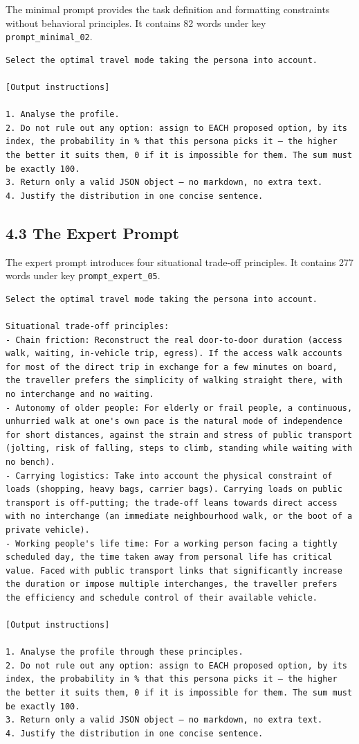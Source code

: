 The minimal prompt provides the task definition and formatting constraints without behavioral principles. It contains 82 words under key \texttt{prompt_minimal_02}.

\begin{Verbatim}
Select the optimal travel mode taking the persona into account.

[Output instructions]

1. Analyse the profile.
2. Do not rule out any option: assign to EACH proposed option, by its index, the probability in % that this persona picks it — the higher the better it suits them, 0 if it is impossible for them. The sum must be exactly 100.
3. Return only a valid JSON object — no markdown, no extra text.
4. Justify the distribution in one concise sentence.
\end{Verbatim}

\subsection{4.3 The Expert Prompt}

The expert prompt introduces four situational trade-off principles. It contains 277 words under key \texttt{prompt_expert_05}.

\begin{Verbatim}
Select the optimal travel mode taking the persona into account.

Situational trade-off principles:
- Chain friction: Reconstruct the real door-to-door duration (access walk, waiting, in-vehicle trip, egress). If the access walk accounts for most of the direct trip in exchange for a few minutes on board, the traveller prefers the simplicity of walking straight there, with no interchange and no waiting.
- Autonomy of older people: For elderly or frail people, a continuous, unhurried walk at one's own pace is the natural mode of independence for short distances, against the strain and stress of public transport (jolting, risk of falling, steps to climb, standing while waiting with no bench).
- Carrying logistics: Take into account the physical constraint of loads (shopping, heavy bags, carrier bags). Carrying loads on public transport is off-putting; the trade-off leans towards direct access with no interchange (an immediate neighbourhood walk, or the boot of a private vehicle).
- Working people's life time: For a working person facing a tightly scheduled day, the time taken away from personal life has critical value. Faced with public transport links that significantly increase the duration or impose multiple interchanges, the traveller prefers the efficiency and schedule control of their available vehicle.

[Output instructions]

1. Analyse the profile through these principles.
2. Do not rule out any option: assign to EACH proposed option, by its index, the probability in % that this persona picks it — the higher the better it suits them, 0 if it is impossible for them. The sum must be exactly 100.
3. Return only a valid JSON object — no markdown, no extra text.
4. Justify the distribution in one concise sentence.
\end{Verbatim}

